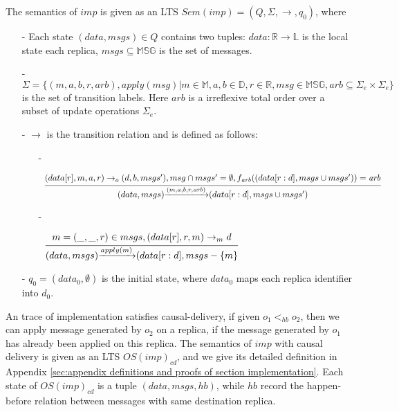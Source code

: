 The semantics of $imp$ is given as an LTS $Sem(imp) = (Q,\Sigma,\rightarrow,q_0)$, where

\begin{itemize}
\setlength{\itemsep}{0.5pt}
\item[-] Each state $(data,msgs) \in Q$ contains two tuples: $data: \mathbb{R} \rightarrow \mathbb{L}$ is the local state each replica, $msgs \subseteq \mathbb{MSG}$ is the set of messages.

\item[-] {\color {red}$\Sigma = \{ (m,a,b,r,\mathit{arb}), apply(msg) \vert m \in \mathbb{M}, a,b \in \mathbb{D}, r \in \mathbb{R}, msg \in \mathbb{MSG},\mathit{arb} \subseteq \Sigma_e \times \Sigma_e \}$ is the set of transition labels. Here $\mathit{arb}$ is a irreflexive total order over a subset of update operations $\Sigma_e$.}

\item[-] $\rightarrow$ is the transition relation and is defined as follows:

    \begin{itemize}
    \setlength{\itemsep}{0.5pt}
    \item[-] %

    $\begin{array}{l c} \bigfrac{ (data[r],m,a,r) \rightarrow_o (d,b,msgs'), msg \cap msgs' = \emptyset, f_{\mathit{arb}}((data[r:d], msgs \cup msgs')) = \mathit{arb}} {(data,msgs) {\xrightarrow{(m,a,b,r,\mathit{arb})}} (data[r:d],msgs \cup msgs')} \end{array}$

    \item[-] %

    $\begin{array}{l c} \bigfrac{ m = (\_,\_,r) \in msgs,(data[r],r,m) \rightarrow_m d } {(data,msgs) {\xrightarrow{apply(m)}} (data[r:d],msgs - \{ m \}} \end{array}$
    \end{itemize}

\item[-] $q_0 = (data_0,\emptyset)$ is the initial state, where $data_0$ maps each replica identifier into $d_0$.
\end{itemize}

An trace of implementation satisfies causal-delivery, if given $o_1 <_{\mathit{hb}} o_2$, then we can apply message generated by $o_2$ on a replica, if the message generated by $o_1$ has already been applied on this replica. The semantics of $imp$ with causal delivery is given as an LTS $OS(imp)_{\mathit{cd}}$, and we give its detailed definition in Appendix \ref{sec:appendix definitions and proofs of section implementation}. Each state of $OS(imp)_{\mathit{cd}}$ is a tuple $(data,msgs,\mathit{hb})$, while $\mathit{hb}$ record the happen-before relation between messages with same destination replica.




